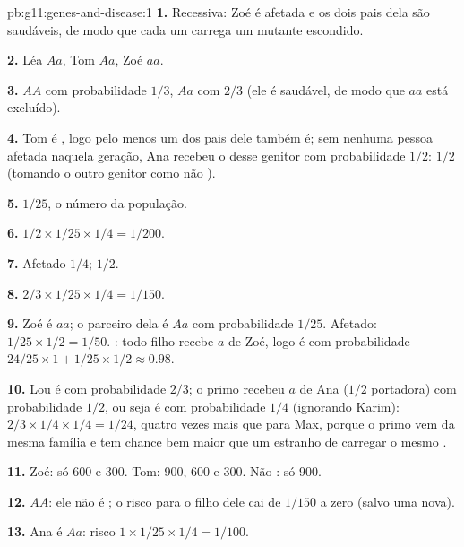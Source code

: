 \begin{solution}{pb:g11:genes-and-disease:1}
\textbf{1.} Recessiva: Zoé é afetada e os dois pais dela são saudáveis,
de modo que cada um carrega um  mutante escondido.

\textbf{2.} Léa $Aa$, Tom $Aa$, Zoé $aa$.

\textbf{3.} $AA$ com probabilidade $1/3$, $Aa$ com $2/3$ (ele é
saudável, de modo que $aa$ está excluído).

\textbf{4.} Tom é , logo pelo menos um dos pais dele também é;
sem nenhuma pessoa afetada naquela geração, Ana recebeu o  desse
genitor com probabilidade $1/2$: $1/2$ (tomando o outro genitor como
não ).

\textbf{5.} $1/25$, o número da população.

\textbf{6.} $1/2 \times 1/25 \times 1/4 = 1/200$.

\textbf{7.} Afetado $1/4$;  $1/2$.

\textbf{8.} $2/3 \times 1/25 \times 1/4 = 1/150$.

\textbf{9.} Zoé é $aa$; o parceiro dela é $Aa$ com probabilidade
$1/25$. Afetado: $1/25 \times 1/2 = 1/50$. : todo filho recebe
$a$ de Zoé, logo é  com probabilidade $24/25 \times 1 + 1/25 \times
1/2 \approx 0.98$.

\textbf{10.} Lou é  com probabilidade $2/3$; o primo recebeu
$a$ de Ana ($1/2$ portadora) com probabilidade $1/2$, ou seja é
 com probabilidade $1/4$ (ignorando Karim): $2/3 \times 1/4
\times 1/4 = 1/24$, quatro vezes mais que para Max, porque o primo vem
da mesma família e tem chance bem maior que um estranho de carregar o
mesmo .

\textbf{11.} Zoé: só 600 e 300. Tom: 900, 600 e 300. Não : só 900.

\textbf{12.} $AA$: ele não é ; o risco para o filho dele cai de
$1/150$ a zero (salvo uma  nova).

\textbf{13.} Ana é $Aa$: risco $1 \times 1/25 \times 1/4 = 1/100$.


\end{solution}
